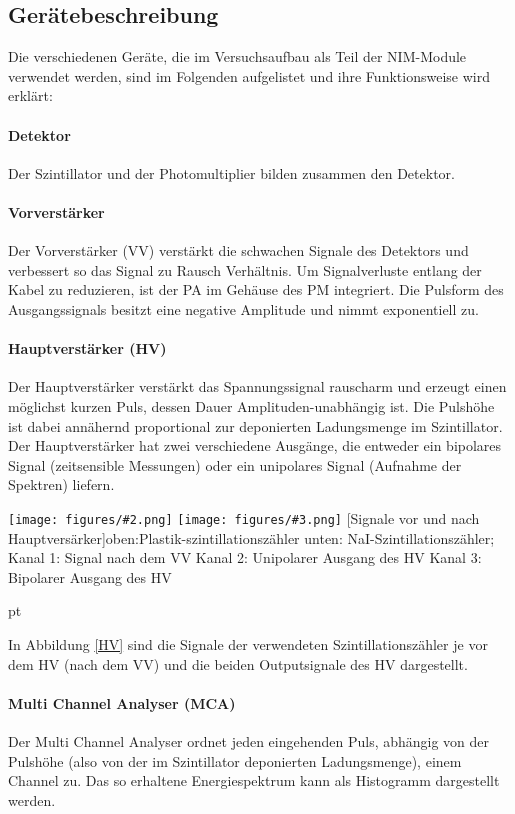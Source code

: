 \documentclass[12pt,listof=totoc]{scrartcl}
\newcommand{\graTwoShort}[5][0.49]{
	\begin{minipage}[h!]{\textwidth}
		\centering
		\texttt{[image: figures/\#2.png]}
		\texttt{[image: figures/\#3.png]}
		\captionof{figure}[#4]{#5}
	\end{minipage}
	\vskip 30 pt
}
\begin{document}
 \subsection{Gerätebeschreibung \label{Geräte}}
 
 Die verschiedenen Geräte, die im Versuchsaufbau als Teil der NIM-Module verwendet werden, sind im Folgenden aufgelistet und ihre Funktionsweise wird erklärt:
 
 \paragraph{Detektor} Der Szintillator und der Photomultiplier bilden zusammen den Detektor.
 \paragraph{Vorverstärker}
 Der Vorverstärker (VV) verstärkt die schwachen Signale des Detektors und verbessert so
 das Signal zu Rausch Verhältnis. Um Signalverluste entlang der Kabel zu reduzieren, ist der PA im Gehäuse des PM integriert. Die Pulsform des Ausgangssignals besitzt eine negative Amplitude und nimmt exponentiell zu.
 \paragraph{Hauptverstärker (HV)}
 Der Hauptverstärker  verstärkt das Spannungssignal rauscharm und erzeugt einen möglichst kurzen Puls, dessen Dauer Amplituden-unabhängig ist. Die Pulshöhe ist dabei annähernd proportional zur deponierten Ladungsmenge im Szintillator. Der Hauptverstärker hat zwei verschiedene Ausgänge, die entweder ein bipolares Signal (zeitsensible Messungen) oder ein unipolares Signal (Aufnahme der Spektren) liefern.
 
 \graTwoShort[0.5]{Plastik-Verstaerker}{NaI-Verstaerker}{Signale vor und nach Hauptversärker}{oben:Plastik-szintillationszähler unten: NaI-Szintillationszähler; Kanal 1: Signal nach dem VV Kanal 2: Unipolarer Ausgang des HV Kanal 3: Bipolarer Ausgang des HV \label{HV}}
 
 In Abbildung \ref{HV} sind die Signale der verwendeten Szintillationszähler je vor dem HV (nach dem VV) und die beiden Outputsignale des HV dargestellt.
 \paragraph{Multi Channel Analyser (MCA)}
 Der Multi Channel Analyser ordnet jeden eingehenden Puls, abhängig von der Pulshöhe (also von der im Szintillator deponierten Ladungsmenge), einem Channel zu. Das so erhaltene Energiespektrum kann als Histogramm dargestellt werden.
\end{document}
